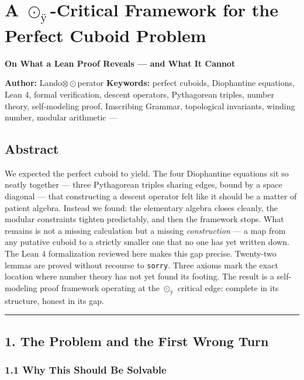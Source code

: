 \section{\texorpdfstring{A \(\odot_{\text{ÿ}}\)-Critical Framework for
the Perfect Cuboid
Problem}{A \textbackslash odot\_\{\textbackslash text\{ÿ\}\}-Critical Framework for the Perfect Cuboid Problem}}\label{a-odot_textuxff-critical-framework-for-the-perfect-cuboid-problem}

\textbf{On What a Lean Proof Reveals --- and What It Cannot}

\textbf{Author:} Lando\(\otimes\odot\)perator \textbf{Keywords:} perfect
cuboids, Diophantine equations, Lean 4, formal verification, descent
operators, Pythagorean triples, number theory, self-modeling proof,
Imscribing Grammar, topological invariants, winding number, modular
arithmetic ---

\subsection{Abstract}\label{abstract}

We expected the perfect cuboid to yield. The four Diophantine equations
sit so neatly together --- three Pythagorean triples sharing edges,
bound by a space diagonal --- that constructing a descent operator felt
like it should be a matter of patient algebra. Instead we found: the
elementary algebra closes cleanly, the modular constraints tighten
predictably, and then the framework stops. What remains is not a missing
calculation but a missing \emph{construction} --- a map from any
putative cuboid to a strictly smaller one that no one has yet written
down. The Lean 4 formalization reviewed here makes this gap precise.
Twenty-two lemmas are proved without recourse to \texttt{sorry}. Three
axioms mark the exact location where number theory has not yet found its
footing. The result is a self-modeling proof framework operating at the
\(\odot_{\text{ÿ}}\) critical edge: complete in its structure, honest in
its gap.

\begin{center}\rule{0.5\linewidth}{0.5pt}\end{center}

\subsection{1. The Problem and the First Wrong
Turn}\label{the-problem-and-the-first-wrong-turn}

\subsubsection{1.1 Why This Should Be
Solvable}\label{why-this-should-be-solvable}

